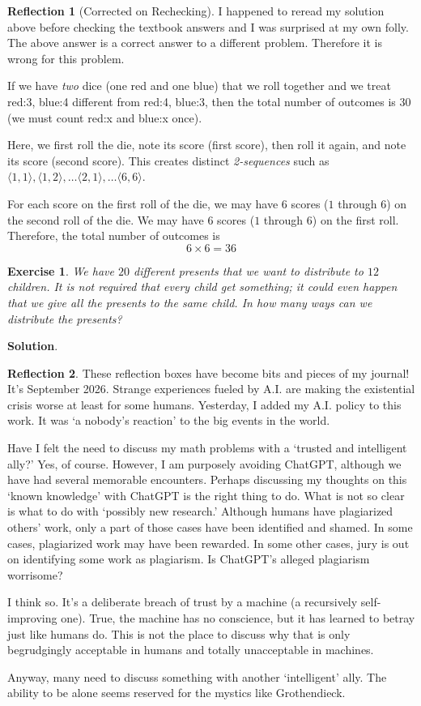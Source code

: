 \documentclass[11pt]{book}
\theoremstyle{definition}
\theoremstyle{plain}
\newtheorem{exercise}{Exercise}
\theoremstyle{definition}
\theoremstyle{problemstyle}
\theoremstyle{remark}
\theoremstyle{definition}
\newtheorem{reflection}{Reflection}
\begin{document}
\begin{reflection}[Corrected on Rechecking]
    I happened to reread my solution above before checking the textbook answers and I was surprised at my own folly. The above answer is a correct answer to a different problem. Therefore it is wrong for this problem. 

    If we have \emph{two} dice (one red and one blue) that we roll together and we treat red:3, blue:4 different from red:4, blue:3, then the total number of outcomes is $30$ (we must count red:x and blue:x once).

    Here, we first roll the die, note its score (first score), then roll it again, and note its score (second score). This creates distinct \emph{2-sequences} such as $\langle1,1\rangle,\langle1,2\rangle,\dots\langle2,1\rangle,\dots\langle6,6\rangle$.

    For each score on the first roll of the die, we may have $6$ scores ($1$ through $6$) on the second roll of the die. We may have $6$ scores ($1$ through $6$) on the first roll. Therefore, the total number of outcomes is 
    \[
        6\times 6=36
    \]
\end{reflection}
\begin{exercise}
    We have $20$ different presents that we want to distribute to $12$ children.  It is not required that every child get something; it could even happen that we give all the presents to the same child. In how many ways can we distribute the presents?
    \label{ex:1.5.5}
\end{exercise}
\textbf{Solution}.
\begin{reflection}
    These reflection boxes have become bits and pieces of my journal! It's September 2026. Strange experiences fueled by A.I. are making the existential crisis worse at least for some humans. Yesterday, I added my A.I. policy to this work. It was  `a nobody's reaction' to the big events in the world. 

    Have I felt the need to discuss my math problems with a `trusted and intelligent ally?' Yes, of course. However, I am purposely avoiding ChatGPT, although we have had several memorable encounters. Perhaps discussing my thoughts on this `known knowledge' with ChatGPT is the right thing to do. What is not so clear is what to do with `possibly new research.' Although humans have plagiarized others' work, only a part of those cases have been identified and shamed. In some cases, plagiarized work may have been rewarded. In some other cases, jury is out on identifying some work as plagiarism. Is ChatGPT's alleged plagiarism worrisome?

    I think so. It's a deliberate breach of trust by a machine (a recursively self-improving one). True, the machine has no conscience, but it has learned to betray just like humans do. This is not the place to discuss why that is only begrudgingly acceptable in humans and totally unacceptable in machines. 

    Anyway, many need to discuss something with another `intelligent' ally. The ability to be alone seems reserved for the mystics like Grothendieck.
\end{reflection}
\end{document}
